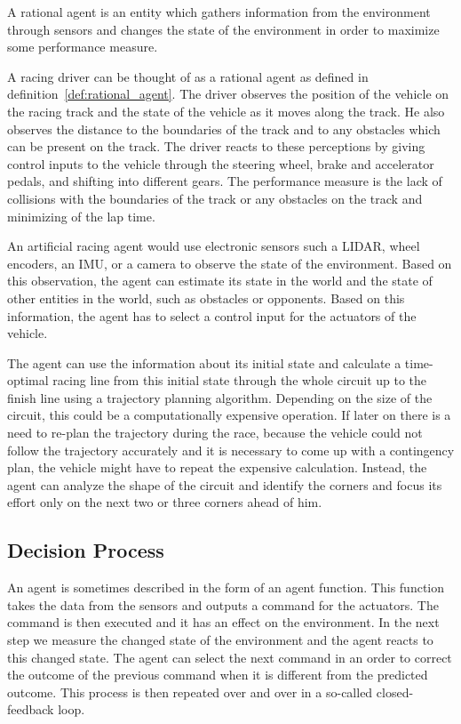 \begin{defn}\label{def:rational_agent}
    A rational agent is an entity which gathers information from the environment through sensors and changes the state of the environment in order to maximize some performance measure.
\end{defn}

A racing driver can be thought of as a rational agent as defined in definition~\ref{def:rational_agent}. The driver observes the position of the vehicle on the racing track and the state of the vehicle as it moves along the track. He also observes the distance to the boundaries of the track and to any obstacles which can be present on the track. The driver reacts to these perceptions by giving control inputs to the vehicle through the steering wheel, brake and accelerator pedals, and shifting into different gears. The performance measure is the lack of collisions with the boundaries of the track or any obstacles on the track and minimizing of the lap time.

An artificial racing agent would use electronic sensors such a LIDAR, wheel encoders, an IMU, or a camera to observe the state of the environment. Based on this observation, the agent can estimate its state in the world and the state of other entities in the world, such as obstacles or opponents. Based on this information, the agent has to select a control input for the actuators of the vehicle.

The agent can use the information about its initial state and calculate a time-optimal racing line from this initial state through the whole circuit up to the finish line using a trajectory planning algorithm. Depending on the size of the circuit, this could be a computationally expensive operation. If later on there is a need to re-plan the trajectory during the race, because the vehicle could not follow the trajectory accurately and it is necessary to come up with a contingency plan, the vehicle might have to repeat the expensive calculation. Instead, the agent can analyze the shape of the circuit and identify the corners and focus its effort only on the next two or three corners ahead of him.

\subsection{Decision Process}

An agent is sometimes described in the form of an agent function. This function takes the data from the sensors and outputs a command for the actuators. The command is then executed and it has an effect on the environment. In the next step we measure the changed state of the environment and the agent reacts to this changed state. The agent can select the next command in an order to correct the outcome of the previous command when it is different from the predicted outcome. This process is then repeated over and over in a so-called closed-feedback loop.

